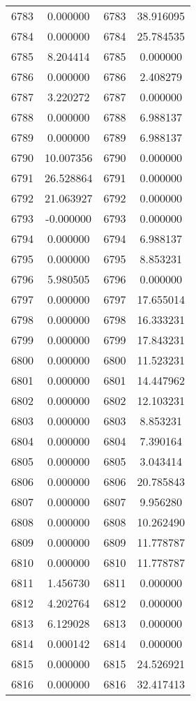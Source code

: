 \documentclass[12pt]{article}
\begin{document}
\begin{longtable}{@{}cccc@{}}
6783 & 0.000000 & 6783 & 38.916095 \\
6784 & 0.000000 & 6784 & 25.784535 \\
6785 & 8.204414 & 6785 & 0.000000 \\
6786 & 0.000000 & 6786 & 2.408279 \\
6787 & 3.220272 & 6787 & 0.000000 \\
6788 & 0.000000 & 6788 & 6.988137 \\
6789 & 0.000000 & 6789 & 6.988137 \\
6790 & 10.007356 & 6790 & 0.000000 \\
6791 & 26.528864 & 6791 & 0.000000 \\
6792 & 21.063927 & 6792 & 0.000000 \\
6793 & -0.000000 & 6793 & 0.000000 \\
6794 & 0.000000 & 6794 & 6.988137 \\
6795 & 0.000000 & 6795 & 8.853231 \\
6796 & 5.980505 & 6796 & 0.000000 \\
6797 & 0.000000 & 6797 & 17.655014 \\
6798 & 0.000000 & 6798 & 16.333231 \\
6799 & 0.000000 & 6799 & 17.843231 \\
6800 & 0.000000 & 6800 & 11.523231 \\
6801 & 0.000000 & 6801 & 14.447962 \\
6802 & 0.000000 & 6802 & 12.103231 \\
6803 & 0.000000 & 6803 & 8.853231 \\
6804 & 0.000000 & 6804 & 7.390164 \\
6805 & 0.000000 & 6805 & 3.043414 \\
6806 & 0.000000 & 6806 & 20.785843 \\
6807 & 0.000000 & 6807 & 9.956280 \\
6808 & 0.000000 & 6808 & 10.262490 \\
6809 & 0.000000 & 6809 & 11.778787 \\
6810 & 0.000000 & 6810 & 11.778787 \\
6811 & 1.456730 & 6811 & 0.000000 \\
6812 & 4.202764 & 6812 & 0.000000 \\
6813 & 6.129028 & 6813 & 0.000000 \\
6814 & 0.000142 & 6814 & 0.000000 \\
6815 & 0.000000 & 6815 & 24.526921 \\
6816 & 0.000000 & 6816 & 32.417413 \\

\end{longtable}
\end{document}
